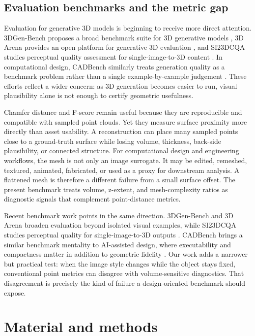 \documentclass[12pt,a4paper]{article}
\begin{document}
\subsection{Evaluation benchmarks and the metric gap}

Evaluation for generative 3D models is beginning to receive more direct attention. 3DGen-Bench proposes a broad benchmark suite for 3D generative models \parencite{jiang2025threedgenbench}, 3D Arena provides an open platform for generative 3D evaluation \parencite{ebert2025threedarena}, and SI23DCQA studies perceptual quality assessment for single-image-to-3D content \parencite{fu2025si23dcqa}. In computational design, CADBench similarly treats generation quality as a benchmark problem rather than a single example-by-example judgement \parencite{doris2026cadbench}. These efforts reflect a wider concern: as 3D generation becomes easier to run, visual plausibility alone is not enough to certify geometric usefulness.

Chamfer distance and F-score remain useful because they are reproducible and compatible with sampled point clouds. Yet they measure surface proximity more directly than asset usability. A reconstruction can place many sampled points close to a ground-truth surface while losing volume, thickness, back-side plausibility, or connected structure. For computational design and engineering workflows, the mesh is not only an image surrogate. It may be edited, remeshed, textured, animated, fabricated, or used as a proxy for downstream analysis. A flattened mesh is therefore a different failure from a small surface offset. The present benchmark treats volume, z-extent, and mesh-complexity ratios as diagnostic signals that complement point-distance metrics.

Recent benchmark work points in the same direction. 3DGen-Bench and 3D Arena broaden evaluation beyond isolated visual examples, while SI23DCQA studies perceptual quality for single-image-to-3D outputs \parencite{jiang2025threedgenbench,ebert2025threedarena,fu2025si23dcqa}. CADBench brings a similar benchmark mentality to AI-assisted design, where executability and compactness matter in addition to geometric fidelity \parencite{doris2026cadbench}. Our work adds a narrower but practical test: when the image style changes while the object stays fixed, conventional point metrics can disagree with volume-sensitive diagnostics. That disagreement is precisely the kind of failure a design-oriented benchmark should expose.

\section{Material and methods}
\end{document}

